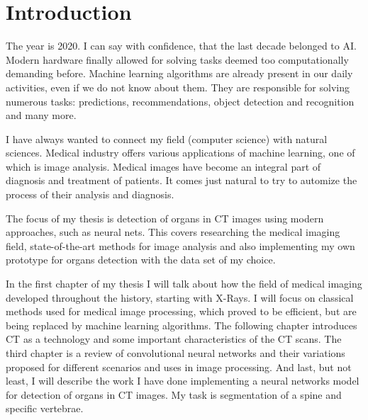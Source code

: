 \chapter{Introduction}
The year is 2020. I can say with confidence, that the last decade belonged to AI. Modern hardware finally allowed for solving tasks deemed too computationally demanding before. Machine learning algorithms are already present in our daily activities, even if we do not know about them. They are responsible for solving numerous tasks: predictions, recommendations, object detection and recognition and many more.  

I have always wanted to connect my field (computer science) with natural sciences. Medical industry offers various applications of machine learning, one of which is image analysis. Medical images have become an integral part of diagnosis and treatment of patients. It comes just natural to try to automize the process of their analysis and diagnosis. 

The focus of my thesis is detection of organs in CT images using modern approaches, such as neural nets. This covers researching the medical imaging field, state-of-the-art methods for image analysis and also implementing my own prototype for organs detection with the data set of my choice. 

In the first chapter of my thesis I will talk about how the field of medical imaging developed throughout the history, starting with X-Rays. I will focus on classical methods used for medical image processing, which proved to be efficient, but are being replaced by machine learning algorithms. The following chapter introduces CT as a technology and some important characteristics of the CT scans. The third chapter is a review of convolutional neural networks and their variations proposed for different scenarios and uses in image processing. And last, but not least, I will describe the work I have done implementing a neural networks model for detection of organs in CT images. My task is segmentation of a spine and specific vertebrae. 